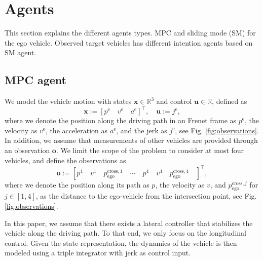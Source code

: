 \section{Agents}\label{sec:agents}
This section explains the different agents types. MPC and sliding mode (SM) for the ego vehicle. Observed target vehicles has different intention agents based on SM agent. 

\subsection{MPC agent}\label{sec:mpc}
We model the vehicle motion with states $\mathbf{x}\in\mathbb{R}^3$ and control $\mathbf{u}\in\mathbb{R}$, defined as
\begin{equation}
\mathbf{x}:=[p^\mathrm{e}\quad v^\mathrm{e}\quad a^\mathrm{e}]^\top,\quad \mathbf{u}:=j^\mathrm{e},
\end{equation}
where we denote the position along the driving path in an Frenet frame as $p^\mathrm{e}$, the velocity as $v^\mathrm{e}$, the acceleration as $a^\mathrm{e}$, and the jerk as $j^\mathrm{e}$, see Fig. \ref{fig:observations}. In addition, we assume  that measurements of other vehicles are provided through an observation  $\mathbf{o}$. We limit the scope of the problem to consider at most four vehicles, and define  the observations as
\begin{equation}
\mathbf{o} := [p^1\quad v^1\quad p^{\mathrm{cross},1}_\mathrm{ego}\quad \cdots\quad p^4\quad v^4\quad p^{\mathrm{cross},4}_\mathrm{ego}\quad ]^\top,
\end{equation}
where we denote the position along its path as $p$, the velocity as $v$, and $p^{\mathrm{cross},j}_\mathrm{ego}$ for $j\in[1,4]$, as the distance to the ego-vehicle from the intersection point, see Fig. \ref{fig:observations}.

In this paper, we assume that there exists a lateral controller that stabilizes the vehicle along the driving path. To that end, we only focus on the longitudinal control. Given the state representation, the dynamics of the vehicle is then modeled using a  triple integrator with jerk as control input.

